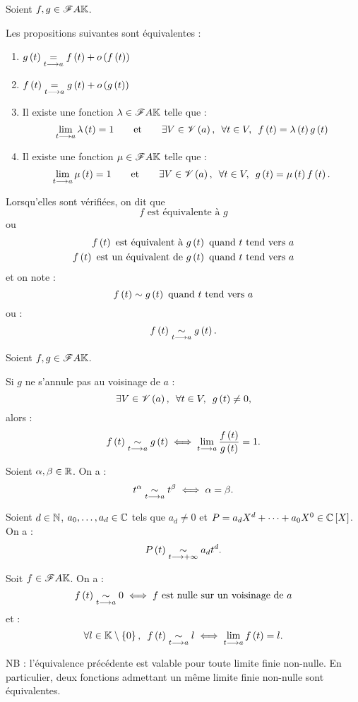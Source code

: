 \begin{defprop}
Soient \(f,g\in\mathscr{F}{A}{\mathbb{K}}\).

Les propositions suivantes sont équivalentes :

\begin{enumerate}
    \item \(g\left(t\right)\underset{t\longrightarrow a}{=}f\left(t\right)+o\left(f\left(t\right)\right)\) \\
    \item \(f\left(t\right)\underset{t\longrightarrow a}{=}g\left(t\right)+o\left(g\left(t\right)\right)\) \\
    \item Il existe une fonction \(\lambda\in\mathscr{F}{A}{\mathbb{K}}\) telle que : \[\lim_{t\to a}\lambda\paren{t}=1\qquad\text{et}\qquad\quantifs{\exists V\in\V{a};\forall t\in V}f\paren{t}=\lambda\paren{t}g\paren{t}\]
    \item Il existe une fonction \(\mu\in\mathscr{F}{A}{\mathbb{K}}\) telle que : \[\lim_{t\to a}\mu\paren{t}=1\qquad\text{et}\qquad\quantifs{\exists V\in\V{a};\forall t\in V}g\paren{t}=\mu\paren{t}f\paren{t}.\]
\end{enumerate}

Lorsqu'elles sont vérifiées, on dit que \[f\text{ est équivalente à }g\] ou \[\begin{aligned}
f\left(t\right)\text{ est équivalent à }g\left(t\right)\text{ quand }t\text{ tend vers }a \\
f\left(t\right)\text{ est un équivalent de }g\left(t\right)\text{ quand }t\text{ tend vers }a
\end{aligned}\] et on note : \[f\left(t\right)\sim g\left(t\right)\text{ quand }t\text{ tend vers }a\] ou : \[f\left(t\right)\underset{t\longrightarrow a}{\sim}g\left(t\right).\]
\end{defprop}

\begin{prop}
Soient \(f,g\in\mathscr{F}{A}{\mathbb{K}}\).

Si \(g\) ne s'annule pas au voisinage de \(a\) : \[\quantifs{\exists V\in\V{a};\forall t\in V}g\paren{t}\not=0,\] alors : \[f\left(t\right)\underset{t\longrightarrow a}{\sim}g\left(t\right)\iff\lim_{t\longrightarrow a}\dfrac{f\left(t\right)}{g\left(t\right)}=1.\]
\end{prop}

\begin{ex}
Soient \(\alpha,\beta\in\mathbb{R}\). On a : \[t^\alpha\underset{t\longrightarrow a}{\sim}t^\beta\iff\alpha=\beta.\]

Soient \(d\in\mathbb{N}\), \(a_0,\dots,a_d\in\mathbb{C}\) tels que \(a_d\not=0\) et \(P=a_dX^d+\dots+a_0X^0\in\poly[\C]\). On a : \[P\left(t\right)\underset{t\longrightarrow+\infty}{\sim}a_dt^d.\]

Soit \(f\in\mathscr{F}{A}{\mathbb{K}}\). On a : \[f\left(t\right)\underset{t\longrightarrow a}{\sim}0\iff f\text{ est nulle sur un voisinage de }a\] et : \[\quantifs{\forall l\in\K\excluant\accol{0}}f\paren{t}\simqd{t\to a}l\ssi\lim_{t\to a}f\paren{t}=l.\]

NB : l'équivalence précédente est valable pour toute limite finie non-nulle. En particulier, deux fonctions admettant un même limite finie non-nulle sont équivalentes.
\end{ex}


